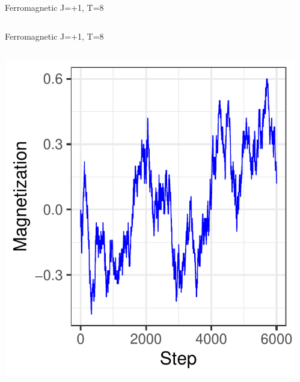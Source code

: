 \documentclass{beamer}
\begin{document}
\begin{frame}{Ferromagnetic J=+1, T=8}
\begin{columns}
\begin{column}{0.5\textwidth}
\begin{center}
     \end{center}
\end{column}
\end{columns}
\end{frame}

\begin{frame}{Ferromagnetic J=+1, T=8}
\begin{columns}
\begin{column}{0.5\textwidth}
    \begin{center}
     \includegraphics[width=\textwidth]{Pic/J+1_10_6000_T=8_Magnetization.pdf}
     \end{center}
\end{column}
\begin{column}{0.5\textwidth}
    \begin{center}

\end{center}
\end{column}
\end{columns}
\end{frame}
\end{document}
